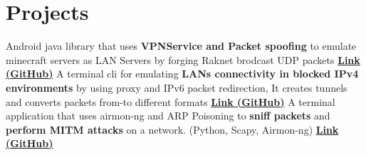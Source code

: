 \section{Projects}
  \resumeSubHeadingListStart
      {Android java library that uses \textbf{VPNService and Packet spoofing} to emulate minecraft servers as LAN Servers by forging Raknet brodcast UDP packets \href{https://github.com/hari01584/libMcServerProxy}{\textbf{Link (GitHub)}}}
      {A terminal cli for emulating \textbf{LANs connectivity in blocked IPv4 environments} by using proxy and IPv6 packet redirection, It creates tunnels and converts packets from-to different formats \href{https://github.com/hari01584/ishe}{\textbf{Link (GitHub)}}}
      {A terminal application that uses airmon-ng and ARP Poisoning to \textbf{sniff packets} and \textbf{perform MITM attacks} on a network. (Python, Scapy, Airmon-ng) \href{https://github.com/hari01584/ishe}{\textbf{Link (GitHub)}}}
  \resumeSubHeadingListEnd